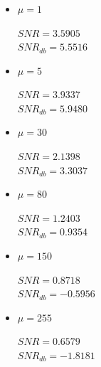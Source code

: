 \documentclass[a4paper]{article}
\begin{document}
\subsubsection{}
\begin{itemize}
	\item 
	$\mu = 1$
	\begin{flushleft}
		$SNR = 3.5905$\\
		$SNR_{db} = 5.5516$
	\end{flushleft}
	\item 
	$\mu = 5$
	\begin{flushleft}
		$SNR = 3.9337$\\
		$SNR_{db} = 5.9480$
	\end{flushleft}
	\item 
	$\mu = 30$
	\begin{flushleft}
		$SNR = 2.1398$\\
		$SNR_{db} = 3.3037$
	\end{flushleft}
	\item 
	$\mu = 80$
	\begin{flushleft}
		$SNR = 1.2403$\\
		$SNR_{db} = 0.9354$
	\end{flushleft}
	\item 
	$\mu = 150$
	\begin{flushleft}
		$SNR = 0.8718$\\
		$SNR_{db} = -0.5956 $
	\end{flushleft}
	\item 
	$\mu = 255$
	\begin{flushleft}
		$SNR = 0.6579$\\
		$SNR_{db} = -1.8181 $
	\end{flushleft}
\end{itemize}
\end{document}
